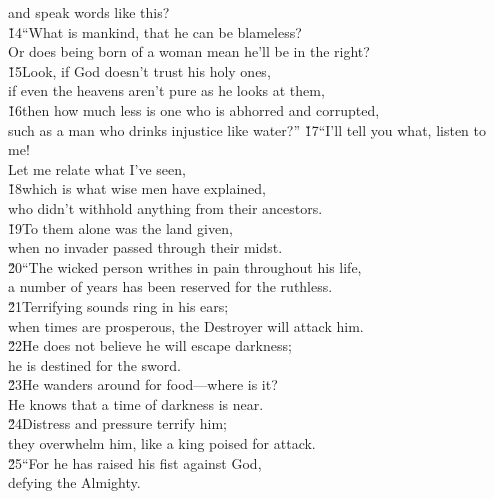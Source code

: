 \begin{poetry}
\poemll    and speak words like this? \\
\poeml \v{14}``What is mankind, that he can be blameless? \\
\poemll    Or does being born of a woman mean he'll be in the right? \\
\poeml \v{15}Look, if God doesn't trust his holy ones, \\
\poemll    if even the heavens aren't pure as he looks at them, \\
\poeml \v{16}then how much less is one who is abhorred and corrupted, \\
\poemll    such as a man who drinks injustice like water?''
\poeml \v{17}``I'll tell you what, listen to me! \\
\poemll    Let me relate what I've seen, \\
\poeml \v{18}which is what wise men have explained, \\
\poemll    who didn't withhold anything from their ancestors. \\
\poeml \v{19}To them alone was the land given, \\
\poemll    when no invader passed through their midst. \\
\poeml \v{20}``The wicked person writhes in pain throughout his life, \\
\poemll    a number of years has been reserved for the ruthless. \\
\poeml \v{21}Terrifying sounds ring in his ears; \\
\poemll    when times are prosperous, the Destroyer will attack him. \\
\poeml \v{22}He does not believe he will escape darkness; \\
\poemll    he is destined for the sword. \\
\poeml \v{23}He wanders around for food---where is it? \\
\poemll    He knows that a time of darkness is near. \\
\poeml \v{24}Distress and pressure terrify him; \\
\poemll    they overwhelm him, like a king poised for attack. \\
\poeml \v{25}``For he has raised his fist against God, \\
\poemll    defying the Almighty. \\

\end{poetry}

